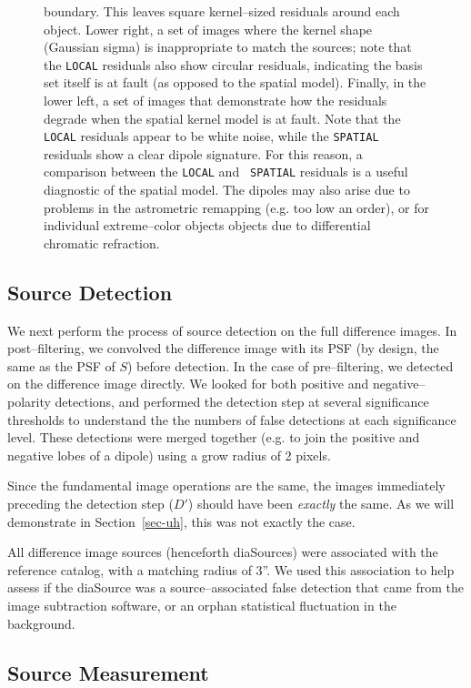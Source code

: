 \documentclass[floatfix, apj]{emulateapj}
\begin{document}
\begin{figure}[!ht]
{  boundary.
  This leaves square kernel--sized residuals around each object.
  Lower right, a set of images where the kernel shape (Gaussian sigma) is
  inappropriate to match the sources; note that the {\tt LOCAL}
  residuals also show circular residuals, indicating the basis set
  itself is at fault (as opposed to the spatial model).
  Finally, in the lower left, a set of images that demonstrate how the
  residuals degrade when the spatial kernel model is at fault.
  Note that the {\tt LOCAL} residuals appear to be white noise, while
  the {\tt SPATIAL} residuals show a clear dipole signature.
  For this reason, a comparison between the {\tt LOCAL} and {\tt
    SPATIAL} residuals is a useful diagnostic of the spatial model.
  The dipoles may also arise due to problems in the astrometric
  remapping (e.g. too low an order), or for individual extreme--color
  objects objects due to differential chromatic refraction.
}
\label{fig:1}
\end{figure}


\subsection{Source Detection}

We next perform the process of source detection on the full difference images.
In post--filtering, we convolved the difference image with its PSF (by design, the same as the PSF of $S$) before detection.
In the case of pre--filtering, we detected on the difference image directly.
We looked for both positive and negative--polarity detections, and performed the detection step at several significance thresholds to understand the the numbers of false detections at each significance level.
These detections were merged together (e.g. to join the positive and negative lobes of a dipole) using a grow radius of 2 pixels.

Since the fundamental image operations are the same, the images immediately preceding the detection step ($D'$) should have been {\it exactly} the same.
As we will demonstrate in Section~\ref{sec-uh}, this was not exactly the case.

All difference image sources (henceforth diaSources) were associated with the reference catalog, with a matching radius of 3''.
We used this association to help assess if the diaSource was a source--associated false detection that came from the image subtraction software, or an orphan statistical fluctuation in the background.

\subsection{Source Measurement}
\end{document}
